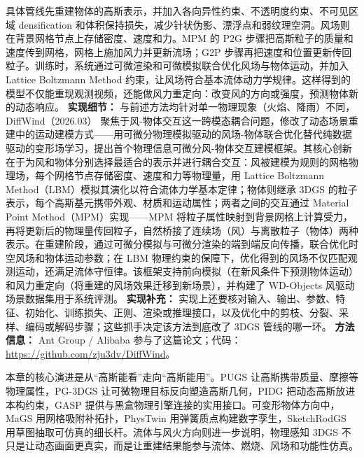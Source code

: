 具体管线先重建物体的高斯表示，并加入各向异性约束、不透明度约束、不可见区域 densification 和体积保持损失，减少针状伪影、漂浮点和弱纹理空洞。风场则在背景网格节点上存储密度、速度和力。MPM 的 P2G 步骤把高斯粒子的质量和速度传到网格，网格上施加风力并更新流场；G2P 步骤再把速度和位置更新传回粒子。训练时，系统通过可微渲染和可微模拟联合优化风场与物体运动，并加入 Lattice Boltzmann Method 约束，让风场符合基本流体动力学规律。这样得到的模型不仅能重现观测视频，还能做风力重定向：改变风的方向或强度，预测物体新的动态响应。
\textbf{实现细节：} 与前述方法均针对单一物理现象（火焰、降雨）不同，DiffWind（2026.03） 聚焦于风-物体交互这一跨模态耦合问题，修改了动态场景重建中的运动建模方式——用可微分物理模拟驱动的风场-物体联合优化替代纯数据驱动的变形场学习，提出首个物理信息可微分风-物体交互建模框架。其核心创新在于为风和物体分别选择最适合的表示并进行耦合交互：风被建模为规则的网格物理场，每个网格节点存储密度、速度和力等物理量，用 Lattice Boltzmann Method（LBM）模拟其演化以符合流体力学基本定律；物体则继承 3DGS 的粒子表示，每个高斯基元携带外观、材质和运动属性；两者之间的交互通过 Material Point Method（MPM）实现——MPM 将粒子属性映射到背景网格上计算受力，再将更新后的物理量传回粒子，自然桥接了连续场（风）与离散粒子（物体）两种表示。在重建阶段，通过可微分模拟与可微分渲染的端到端反向传播，联合优化时空风场和物体运动参数；在 LBM 物理约束的保障下，优化得到的风场不仅匹配观测运动，还满足流体守恒律。该框架支持前向模拟（在新风条件下预测物体运动）和风力重定向（将重建的风场效果迁移到新场景），并构建了 WD-Objects 风驱动场景数据集用于系统评测。
\textbf{实现补充：} 实现上还要核对输入、输出、参数、特征、初始化、训练损失、正则、渲染或推理接口，以及优化中的剪枝、分裂、采样、编码或解码步骤；这些抓手决定该方法到底改了 3DGS 管线的哪一环。
\textbf{方法信息：} Ant Group / Alibaba 参与了这篇论文；代码：\url{https://github.com/zju3dv/DiffWind}。
\begin{takeaway}
本章的核心演进是从“高斯能看”走向“高斯能用”。PUGS 让高斯携带质量、摩擦等物理属性，PG-3DGS 让可微物理目标反向塑造高斯几何，PIDG 把动态高斯放进本构约束，GASP 提供与黑盒物理引擎连接的实用接口。可变形物体方向中，MaGS 用网格吸附补拓扑，PhysTwin 用弹簧质点构建数字孪生，SketchRodGS 用草图抽取可仿真的细长杆。流体与风火方向则进一步说明，物理感知 3DGS 不只是让动态画面更真实，而是让重建结果能参与流体、燃烧、风场和功能性仿真。
\end{takeaway}
